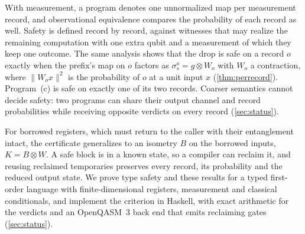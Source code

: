 With measurement, a program denotes one unnormalized map per measurement record, and observational equivalence
compares the probability of each record as well. Safety is defined record by record, against witnesses that may
realize the remaining computation with one extra qubit and a measurement of which they keep one outcome. The
same analysis shows that the drop is safe on a record $o$ exactly when the prefix's map on $o$ factors as
$\sigma_s^o=g\otimes W_o$ with $W_o$ a contraction, where $\lVert W_ox\rVert^2$ is the probability of $o$ at a
unit input $x$ (\cref{thm:perrecord}). Program~(c) is safe on exactly one of its
two records. Coarser semantics cannot decide safety: two programs can share their output channel and record
probabilities while receiving opposite verdicts on every record (\cref{sec:status}).

For borrowed registers, which must return to the caller with their entanglement intact, the certificate
generalizes to an isometry $B$ on the borrowed inputs, $K=B\otimes W$. A safe block is in a known state, so a
compiler can reclaim it, and reusing reclaimed temporaries preserves every record, its probability and the
reduced output state. We prove type safety and these results for a typed first-order language with
finite-dimensional registers, measurement and classical conditionals, and implement the criterion in Haskell,
with exact arithmetic for the verdicts and an OpenQASM~3 back end that emits reclaiming gates
(\cref{sec:status}).
